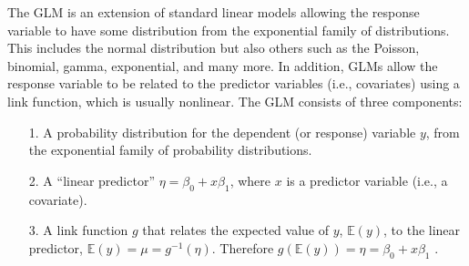 The GLM is an extension of standard linear
models allowing the response
variable to have some distribution from the exponential family of
distributions. This includes the normal
distribution but also others such as the Poisson, binomial,
gamma, exponential, and many more. In addition, GLMs allow the
response variable to be related to the predictor variables (i.e.,
covariates) using a link function, which is usually nonlinear.  
The GLM consists of three components:
\begin{itemize}
\item[1.] A probability distribution for the dependent (or response) variable $y$,
from the exponential family of probability distributions.
\item[2.] A ``linear predictor'' $\eta = \beta_0 + x \beta_1$, where
  $x$ is a predictor variable (i.e., a covariate).
\item[3.] A link function $g$ that relates the expected value of $y$, $\mathbb{E}(y)$, to the linear predictor, $\mathbb{E}(y) = \mu = g^{-1}(\eta)$. Therefore $g(\mathbb{E}(y)) = \eta = \beta_0 + x \beta_1$ .
\end{itemize}
